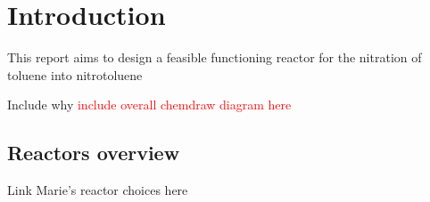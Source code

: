 \section{Introduction}
This report aims to design a feasible functioning reactor for the nitration of toluene into nitrotoluene

Include why 
\textcolor{red}{include overall chemdraw diagram here}
\subsection{Reactors overview}
Link Marie's reactor choices here


